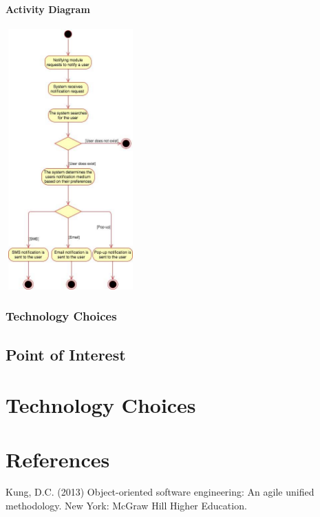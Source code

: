 \documentclass[runningheads,a4paper]{article}
\begin{document}
\paragraph{Activity Diagram}
\begin{center}
\includegraphics[height=10cm,width=5cm]{ActivityDiagram.png} 
\end{center}



\subsubsection{Technology Choices}



\subsection {Point of Interest}



\section{Technology Choices}



\section{References}

Kung, D.C. (2013) Object-oriented software engineering: An agile unified methodology. New York: McGraw Hill Higher Education.
\end{document}
